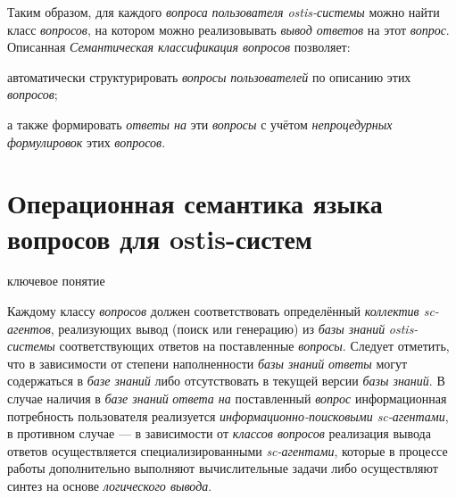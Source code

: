 Таким образом, для каждого \textit{вопроса} \textit{пользователя ostis-системы} можно найти класс \textit{вопросов}, на котором можно реализовывать \textit{вывод ответов} на этот \textit{вопрос}. Описанная \textit{Семантическая классификация вопросов} позволяет:
\begin{textitemize}
	\item автоматически структурировать \textit{вопросы} \textit{пользователей} по описанию этих \textit{вопросов};
	\item а также формировать \textit{ответы на} эти \textit{вопросы} с учётом \textit{непроцедурных формулировок} этих \textit{вопросов}.
\end{textitemize}

\section{Операционная семантика языка вопросов для ostis-систем}
\label{sec_requests_op_semantics}

\begin{SCn}
\begin{scnrelfromlist}{ключевое понятие}
\end{scnrelfromlist}
\end{SCn}

Каждому классу \textit{вопросов} должен соответствовать определённый \textit{коллектив sc-агентов}, реализующих вывод (поиск или генерацию) из \textit{базы знаний} \textit{ostis-системы} соответствующих ответов на поставленные \textit{вопросы}. Следует отметить, что в зависимости от степени наполненности \textit{базы знаний} \textit{ответы} могут содержаться в \textit{базе знаний} либо отсутствовать в текущей версии \textit{базы знаний}. В случае наличия в \textit{базе знаний} \textit{ответа на} поставленный \textit{вопрос} информационная потребность пользователя реализуется \textit{информационно-поисковыми sc-агентами}, в противном случае --- в зависимости от \textit{классов вопросов} реализация вывода ответов осуществляется специализированными \textit{sc-агентами}, которые в процессе работы дополнительно выполняют вычислительные задачи либо осуществляют синтез на основе \textit{логического вывода}.

